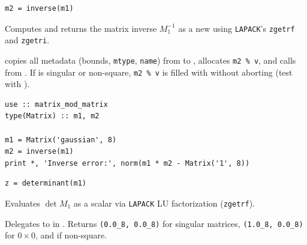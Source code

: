 \lstset{language=[95]Fortran}
\begin{lstlisting}
m2 = inverse(m1)
\end{lstlisting}

Computes and returns the matrix inverse $M_1^{-1}$ as a new  using \texttt{LAPACK}'s \texttt{zgetrf} and \texttt{zgetri}.

 copies all metadata (bounds, \texttt{mtype}, \texttt{name}) from  to , allocates \texttt{m2 \% v}, and calls  from . If  is singular or non-square, \texttt{m2 \% v} is filled with  without aborting (test with ).

\begin{description}[leftmargin=2.2cm, style=nextline]
\end{description}

\lstset{language=[95]Fortran}
\begin{lstlisting}
use :: matrix_mod_matrix
type(Matrix) :: m1, m2

m1 = Matrix('gaussian', 8)
m2 = inverse(m1)
print *, 'Inverse error:', norm(m1 * m2 - Matrix('1', 8))
\end{lstlisting}


\lstset{language=[95]Fortran}
\begin{lstlisting}
z = determinant(m1)
\end{lstlisting}

Evaluates $\det M_1$ as a  scalar via \texttt{LAPACK} LU factorization (\texttt{zgetrf}).

Delegates to  in . Returns \texttt{(0.0\_8, 0.0\_8)} for singular matrices, \texttt{(1.0\_8, 0.0\_8)} for $0\times 0$, and  if non-square.

